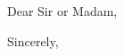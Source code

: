 \documentclass[10pt]{letter}
\begin{document}
\begin{letter}{} %

\opening{Dear Sir or Madam,}

\vspace{1\parskip} %
\closing{Sincerely,}



\end{letter}
\end{document}
